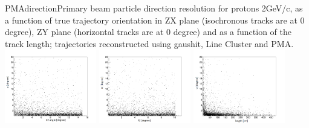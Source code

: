 \begin{cdrfigure}{PMAdirection}{Primary beam particle direction resolution for protons 2GeV/c, as a function of true trajectory orientation in ZX plane (isochronous tracks are at 0 degree), ZY plane (horizontal tracks are at 0 degree) and as a function of the track length; trajectories reconstructed using gaushit, Line Cluster and PMA. }
\includegraphics[width=0.3\textwidth]{figures/dFi-vs-beamXZ_primary_ptoton.png}
\includegraphics[width=0.3\textwidth]{figures/dFi-vs-beamYZ_primary_proton.png}
\includegraphics[width=0.3\textwidth]{figures/dFi-vs-TrkLen_primary_proton.png}
\end{cdrfigure}

